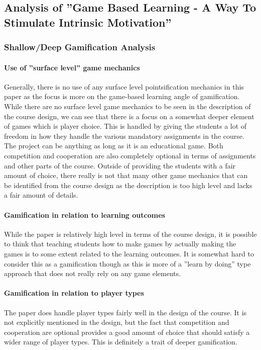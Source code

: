 \subsection{Analysis of ''Game Based Learning - A Way To Stimulate Intrinsic Motivation''}
\subsubsection{Shallow/Deep Gamification Analysis}
\paragraph{Use of ''surface level'' game mechanics}
Generally, there is no use of any surface level pointsification mechanics in this paper as the focus is more on the game-based learning angle of gamification. While there are no surface level game mechanics to be seen in the description of the course design, we can see that there is a focus on a somewhat deeper element of games which is player choice. This is handled by giving the students a lot of freedom in how they handle the various mandatory assignments in the course. The project can be anything as long as it is an educational game. Both competition and cooperation are also completely optional in terms of assignments and other parts of the course. Outside of providing the students with a fair amount of choice, there really is not that many other game mechanics that can be identified from the course design as the description is too high level and lacks a fair amount of details. 

\paragraph{Gamification in relation to learning outcomes}
While the paper is relatively high level in terms of the course design, it is possible to think that teaching students how to make games by actually making the games is to some extent related to the learning outcomes. It is somewhat hard to consider this as a gamification though as this is more of a ''learn by doing'' type approach that does not really rely on any game elements.

\paragraph{Gamification in relation to player types}
The paper does handle player types fairly well in the design of the course. It is not explicitly mentioned in the design, but the fact that competition and cooperation are optional provides a good amount of choice that should satisfy a wider range of player types. This is definitely a trait of deeper gamification. 

